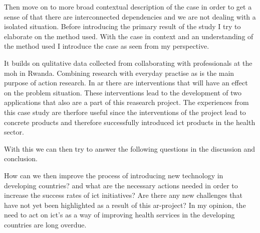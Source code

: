 Then move on to more broad contextual description of the case in order to get a sense of that there are interconnected dependencies and we are not dealing with a isolated situation. 
Before introducing the primary result of the study I try to elaborate on the method used.
With the case in context and an understanding of the method used I introduce the case as seen from my perspective. 

It builds on qulitative data collected from collaborating with professionals at the \gls{moh} in Rwanda. 
Combining research with everyday practise as is the main purpose of action research. 
In \gls{ar} there are interventions that will have an effect on the problem situation.
These interventions lead to the development of two applications that also are a part of this reasearch project. 
The experiences from this case study are therfore useful since the interventions of the project lead to concrete products and therefore successfully introduced \gls{ict} products in the health sector. 



With this we can then try to answer the following questions in the discussion and conclusion.

How can we then improve the process of introducing new technology in developing countries? and what are the necessary actions needed in order to increase the success rates of \gls{ict} initiatives?
Are there any new challenges that have not yet been highlighted as a result of this \gls{ar}-project?
In my opinion, the need to act on \gls{ict}'s as a way of improving health services in the developing countries are long overdue. 




